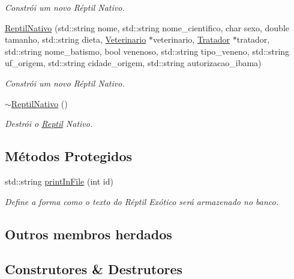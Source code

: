\begin{DoxyCompactItemize}
\begin{DoxyCompactList}\small\item\em Constrói um novo Réptil Nativo. \end{DoxyCompactList}\item 
\hyperlink{classReptilNativo_a0476091e70eeff357cd2c6ea48f0aea0}{Reptil\+Nativo} (std\+::string nome, std\+::string nome\+\_\+cientifico, char sexo, double tamanho, std\+::string dieta, \hyperlink{classVeterinario}{Veterinario} $\ast$veterinario, \hyperlink{classTratador}{Tratador} $\ast$tratador, std\+::string nome\+\_\+batismo, bool venenoso, std\+::string tipo\+\_\+veneno, std\+::string uf\+\_\+origem, std\+::string cidade\+\_\+origem, std\+::string autorizacao\+\_\+ibama)
\begin{DoxyCompactList}\small\item\em Constrói um novo Réptil Nativo. \end{DoxyCompactList}\item 
\mbox{\label{classReptilNativo_a6de5838fd62a1c61175e690110cd7dc0}} 
\hyperlink{classReptilNativo_a6de5838fd62a1c61175e690110cd7dc0}{$\sim$\+Reptil\+Nativo} ()
\begin{DoxyCompactList}\small\item\em Destrói o \hyperlink{classReptil}{Reptil} Nativo. \end{DoxyCompactList}\end{DoxyCompactItemize}
\subsection*{Métodos Protegidos}
\begin{DoxyCompactItemize}
\item 
std\+::string \hyperlink{classReptilNativo_ac801a11c87a2847fb4b46488aa6bb789}{print\+In\+File} (int id)
\begin{DoxyCompactList}\small\item\em Define a forma como o texto do Réptil Exótico será armazenado no banco. \end{DoxyCompactList}\end{DoxyCompactItemize}
\subsection*{Outros membros herdados}


\subsection{Construtores \& Destrutores}
\mbox{\label{classReptilNativo_a1dcdc77205b5491129db3553bbf520fc}} 
